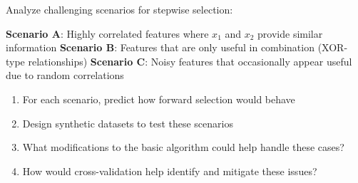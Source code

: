 \documentclass{article}
\newcounter{exercise}
\begin{document}
\begin{tcolorbox}[colback=blue!5!white,colframe=blue!75!black,title=\textbf{Exercise \theexercise: Advanced Feature Selection Scenarios}]
Analyze challenging scenarios for stepwise selection:

\textbf{Scenario A}: Highly correlated features where $x_1$ and $x_2$ provide similar information
\textbf{Scenario B}: Features that are only useful in combination (XOR-type relationships)  
\textbf{Scenario C}: Noisy features that occasionally appear useful due to random correlations

\begin{enumerate}[label=(\alph*)]
    \item For each scenario, predict how forward selection would behave
    \item Design synthetic datasets to test these scenarios
    \item What modifications to the basic algorithm could help handle these cases?
    \item How would cross-validation help identify and mitigate these issues?
\end{enumerate}
\end{tcolorbox}
\end{document}
